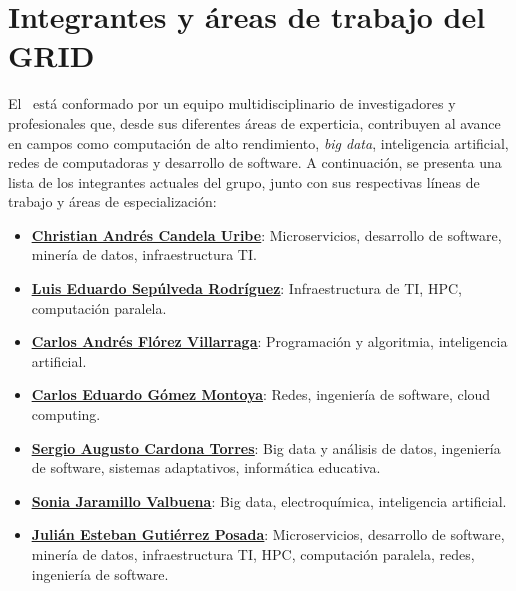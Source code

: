 

\section{Integrantes y áreas de trabajo del GRID}
El \GRID\ está conformado por un equipo multidisciplinario de investigadores y profesionales que, desde sus diferentes áreas de experticia, contribuyen al avance en campos como computación de alto rendimiento, \textit{big data}, inteligencia artificial, redes de computadoras y desarrollo de software. A continuación, se presenta una lista de los integrantes actuales del grupo, junto con sus respectivas líneas de trabajo y áreas de especialización:
\begin{itemize}
	\item \href{https://scienti.minciencias.gov.co/cvlac/visualizador/generarCurriculoCv.do?cod_rh=0000210897}{\underline{{\textbf{Christian Andrés Candela Uribe}}}}: Microservicios, desarrollo de software, minería de datos, infraestructura TI.\@
	\item \href{https://scienti.minciencias.gov.co/cvlac/visualizador/generarCurriculoCv.do?cod_rh=0001383939}{\underline{{\textbf{Luis Eduardo Sepúlveda Rodríguez}}}}: Infraestructura de TI, HPC, computación paralela.
	\item \href{https://scienti.minciencias.gov.co/cvlac/visualizador/generarCurriculoCv.do?cod_rh=0001638854}{\underline{{\textbf{Carlos Andrés Flórez Villarraga}}}}: Programación y algoritmia, inteligencia artificial.
	\item \href{https://scienti.minciencias.gov.co/cvlac/visualizador/generarCurriculoCv.do?cod_rh=0001343801}{\underline{{\textbf{Carlos Eduardo Gómez Montoya}}}}: Redes, ingeniería de software, cloud computing.
	\item \href{https://scienti.minciencias.gov.co/cvlac/visualizador/generarCurriculoCv.do?cod_rh=0001398775}{\underline{{\textbf{Sergio Augusto Cardona Torres}}}}: Big data y análisis de datos, ingeniería de software, sistemas adaptativos, informática educativa.
	\item \href{https://scienti.minciencias.gov.co/cvlac/visualizador/generarCurriculoCv.do?cod_rh=0000193550}{\underline{{\textbf{Sonia Jaramillo Valbuena}}}}: Big data, electroquímica, inteligencia artificial.
	\item \href{https://scienti.minciencias.gov.co/cvlac/visualizador/generarCurriculoCv.do?cod_rh=0000283495}{\underline{{\textbf{Julián Esteban Gutiérrez Posada}}}}: Microservicios, desarrollo de software, minería de datos, infraestructura TI, HPC, computación paralela, redes, ingeniería de software.
\end{itemize}

